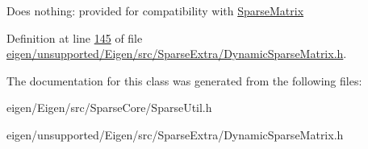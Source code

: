 Does nothing\+: provided for compatibility with \hyperlink{group___sparse_core___module_class_eigen_1_1_sparse_matrix}{Sparse\+Matrix} 

Definition at line \hyperlink{eigen_2unsupported_2_eigen_2src_2_sparse_extra_2_dynamic_sparse_matrix_8h_source_l00145}{145} of file \hyperlink{eigen_2unsupported_2_eigen_2src_2_sparse_extra_2_dynamic_sparse_matrix_8h_source}{eigen/unsupported/\+Eigen/src/\+Sparse\+Extra/\+Dynamic\+Sparse\+Matrix.\+h}.



The documentation for this class was generated from the following files\+:\begin{DoxyCompactItemize}
\item 
eigen/\+Eigen/src/\+Sparse\+Core/\+Sparse\+Util.\+h\item 
eigen/unsupported/\+Eigen/src/\+Sparse\+Extra/\+Dynamic\+Sparse\+Matrix.\+h\end{DoxyCompactItemize}
